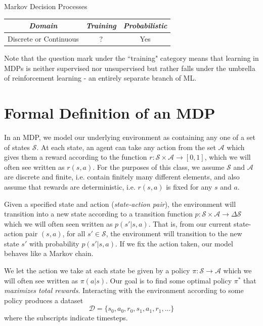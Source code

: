 \begin{mlcube}{Markov Decision Processes}
\begin{center}
    \begin{tabular}{c|c|c}
    \textit{\textbf{Domain}} & \textit{\textbf{Training}} & \textit{\textbf{Probabilistic}} \\
    \hline
    Discrete or Continuous & ? & Yes \\
    \end{tabular}
\end{center}
Note that the question mark under the ``training" category means that learning in MDPs is neither supervised nor unsupervised but rather falls under the umbrella of reinforcement learning - an entirely separate branch of ML. 
\end{mlcube}

\section{Formal Definition of an MDP}
In an MDP, we model our underlying environment as containing any one of a set of states $\mathcal{S}$. At each state, an agent can take any action from the set $\mathcal{A}$ which gives them a reward according to the function $r: \mathcal{S} \times \mathcal{A} \rightarrow [0, 1]$, which we will often see written as $r(s, a)$. For the purposes of this class, we assume $\mathcal{S}$ and $\mathcal{A}$ are discrete and finite, i.e. contain finitely many different elements, and also assume that rewards are deterministic, i.e. $r(s,a)$ is fixed for any $s$ and $a$.

Given a specified state and action (\textit{state-action pair}), the environment will transition into a new state according to a transition function $p: \mathcal{S} \times \mathcal{A}\to \Delta \mathcal{S}$ which we will often seen written as $p(s'|s, a)$. That is, from our current state-action pair $(s,a)$, for all $s'\in \mathcal{S}$, the environment will transition to the new state $s'$ with probability $p(s'|s,a)$. If we fix the action taken, our model behaves like a Markov chain.

We let the action we take at each state be given by a policy $\pi: \mathcal{S} \rightarrow \mathcal{A}$ which we will often see written as $\pi(a|s)$. Our goal is to find some optimal policy $\pi^*$ that \textit{maximizes total rewards}. Interacting with the environment according to some policy produces a dataset 
$$\mathcal{D} = \{s_0, a_0, r_0, s_1, a_1, r_1, \dots\}$$
where the subscripts indicate timesteps.

